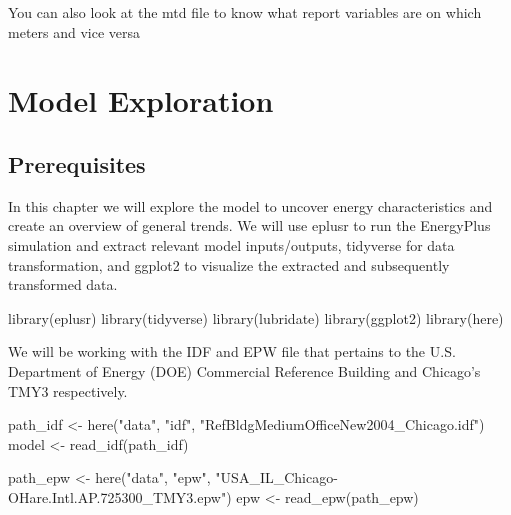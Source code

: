 \documentclass[
]{book}
\newenvironment{Shaded}{\begin{snugshade}}{\end{snugshade}}
\newcommand{\FunctionTok}[1]{\textcolor[rgb]{0.00,0.00,0.00}{#1}}
\newcommand{\NormalTok}[1]{#1}
\newcommand{\OtherTok}[1]{\textcolor[rgb]{0.56,0.35,0.01}{#1}}
\newcommand{\StringTok}[1]{\textcolor[rgb]{0.31,0.60,0.02}{#1}}
\begin{document}
You can also look at the mtd file to know what report variables are on which meters and vice versa

\hypertarget{explore}{%
\chapter{Model Exploration}\label{explore}}

\hypertarget{prerequisites-13}{%
\section{Prerequisites}\label{prerequisites-13}}

In this chapter we will explore the model to uncover energy characteristics and create an overview of general trends. We will use eplusr to run the EnergyPlus simulation and extract relevant model inputs/outputs, tidyverse for data transformation, and ggplot2 to visualize the extracted and subsequently transformed data.

\begin{Shaded}
\begin{Highlighting}[]
\FunctionTok{library}\NormalTok{(eplusr)}
\FunctionTok{library}\NormalTok{(tidyverse)}
\FunctionTok{library}\NormalTok{(lubridate)}
\FunctionTok{library}\NormalTok{(ggplot2)}
\FunctionTok{library}\NormalTok{(here)}
\end{Highlighting}
\end{Shaded}

We will be working with the IDF and EPW file that pertains to the U.S. Department of Energy (DOE) Commercial Reference Building and Chicago's TMY3 respectively.

\begin{Shaded}
\begin{Highlighting}[]
\NormalTok{path\_idf }\OtherTok{\textless{}{-}} \FunctionTok{here}\NormalTok{(}\StringTok{"data"}\NormalTok{, }\StringTok{"idf"}\NormalTok{, }\StringTok{"RefBldgMediumOfficeNew2004\_Chicago.idf"}\NormalTok{)}
\NormalTok{model }\OtherTok{\textless{}{-}} \FunctionTok{read\_idf}\NormalTok{(path\_idf)}

\NormalTok{path\_epw }\OtherTok{\textless{}{-}} \FunctionTok{here}\NormalTok{(}\StringTok{"data"}\NormalTok{, }\StringTok{"epw"}\NormalTok{, }\StringTok{"USA\_IL\_Chicago{-}OHare.Intl.AP.725300\_TMY3.epw"}\NormalTok{)}
\NormalTok{epw }\OtherTok{\textless{}{-}} \FunctionTok{read\_epw}\NormalTok{(path\_epw)}
\end{Highlighting}
\end{Shaded}
\end{document}
